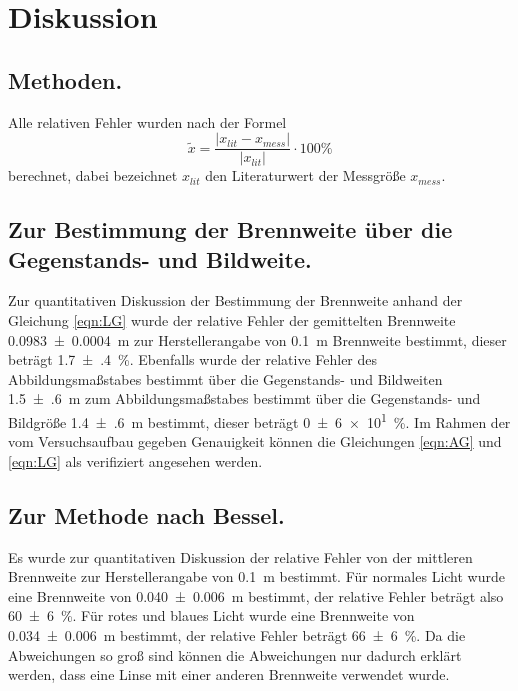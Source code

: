 \section{Diskussion}
\label{sec:Diskussion}
\subsection{Methoden.}
Alle relativen Fehler wurden nach der Formel
\begin{equation*}
  \tilde{x} = \frac{ \lvert x_{lit} - x_{mess} \rvert}{\lvert x_{lit} \rvert}
  \cdot 100 \%
\end{equation*}
berechnet, dabei bezeichnet $x_{lit}$ den Literaturwert der Messgröße $x_{mess}$.

\subsection{Zur Bestimmung der Brennweite über die Gegenstands- und Bildweite.}
Zur quantitativen Diskussion der Bestimmung der Brennweite anhand der Gleichung
\eqref{eqn:LG} wurde der relative Fehler der gemittelten Brennweite
\SI{0.0983(4)}{\meter} zur Herstellerangabe von \SI{0.1}{\meter} Brennweite
bestimmt, dieser beträgt \SI{1.7(4)}{\percent}. Ebenfalls wurde der relative
Fehler des Abbildungsmaßstabes bestimmt über die Gegenstands- und Bildweiten
\SI{1.5(6)}{\meter}
zum Abbildungsmaßstabes bestimmt über die Gegenstands- und Bildgröße
\SI{1.4(6)}{\meter} bestimmt, dieser beträgt \SI{0(6)e1}{\percent}.
Im Rahmen der vom Versuchsaufbau gegeben Genauigkeit können die Gleichungen
\eqref{eqn:AG} und \eqref{eqn:LG} als verifiziert angesehen werden.

\subsection{Zur Methode nach Bessel.}
Es wurde zur quantitativen Diskussion der relative Fehler von
der mittleren Brennweite zur Herstellerangabe von \SI{0.1}{\meter} bestimmt.
Für normales Licht wurde eine Brennweite von \SI{0.040(6)}{\meter} bestimmt,
der relative Fehler beträgt also \SI{60(6)}{\percent}.
Für rotes und blaues Licht wurde eine Brennweite von \SI{0.034(6)}{\meter}
bestimmt, der relative Fehler beträgt \SI{66(6)}{\percent}. Da die Abweichungen
so groß sind können die Abweichungen nur dadurch erklärt werden, dass eine
Linse mit einer anderen Brennweite verwendet wurde.

